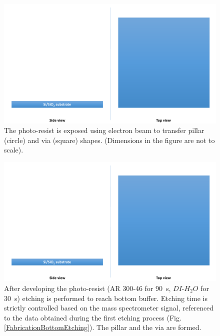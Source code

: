 \begin{multicols}{2}[]
    
    \begin{figure}[H]
        \centering
        \includegraphics[width=0.375\paperwidth, page=11]{img/04/Manufacturing_under.pdf}
        \caption{The photo-resist is exposed using electron beam to transfer pillar (circle) and via (square) shapes. (Dimensions in the figure are not to scale).}
        \label{FabricationPillarExposure}
    \end{figure}
    
    \begin{figure}[H]
        \centering
        \includegraphics[width=0.375\paperwidth, page=12]{img/04/Manufacturing_under.pdf}
        \caption{After developing the photo-resist (AR 300-46 for \SI{90}{\second}, $DI$-$H_2O$ for \SI{30}{\second}) etching is performed to reach bottom buffer. Etching time is strictly controlled based on the mass spectrometer signal, referenced to the data obtained during the first etching process (Fig. \ref{FabricationBottomEtching}). The pillar and the via are formed.}
        \label{FabricationPillarEtching}
    \end{figure}
    
\end{multicols}
